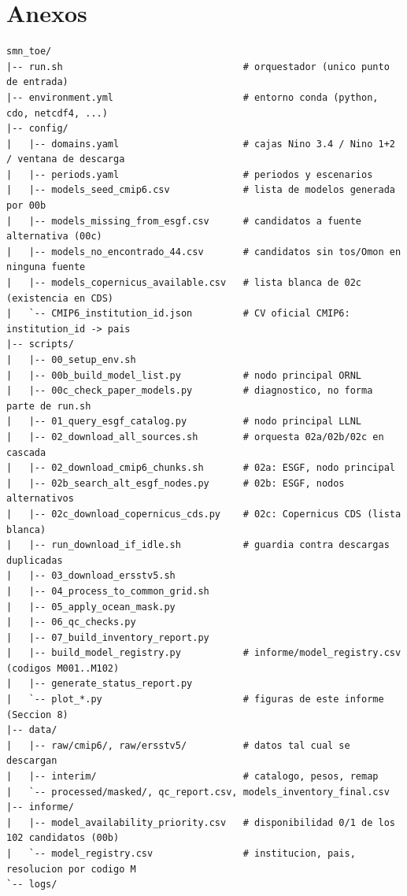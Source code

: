 \documentclass[11pt,a4paper]{article}
\begin{document}
\section{Anexos}
\begin{lstlisting}[style=bashstyle,caption={Estructura interna del repositorio \texttt{smn\_toe}.},label={lst:tree}]
smn_toe/
|-- run.sh                                # orquestador (unico punto de entrada)
|-- environment.yml                       # entorno conda (python, cdo, netcdf4, ...)
|-- config/
|   |-- domains.yaml                      # cajas Nino 3.4 / Nino 1+2 / ventana de descarga
|   |-- periods.yaml                      # periodos y escenarios
|   |-- models_seed_cmip6.csv             # lista de modelos generada por 00b
|   |-- models_missing_from_esgf.csv      # candidatos a fuente alternativa (00c)
|   |-- models_no_encontrado_44.csv       # candidatos sin tos/Omon en ninguna fuente
|   |-- models_copernicus_available.csv   # lista blanca de 02c (existencia en CDS)
|   `-- CMIP6_institution_id.json         # CV oficial CMIP6: institution_id -> pais
|-- scripts/
|   |-- 00_setup_env.sh
|   |-- 00b_build_model_list.py           # nodo principal ORNL
|   |-- 00c_check_paper_models.py         # diagnostico, no forma parte de run.sh
|   |-- 01_query_esgf_catalog.py          # nodo principal LLNL
|   |-- 02_download_all_sources.sh        # orquesta 02a/02b/02c en cascada
|   |-- 02_download_cmip6_chunks.sh       # 02a: ESGF, nodo principal
|   |-- 02b_search_alt_esgf_nodes.py      # 02b: ESGF, nodos alternativos
|   |-- 02c_download_copernicus_cds.py    # 02c: Copernicus CDS (lista blanca)
|   |-- run_download_if_idle.sh           # guardia contra descargas duplicadas
|   |-- 03_download_ersstv5.sh
|   |-- 04_process_to_common_grid.sh
|   |-- 05_apply_ocean_mask.py
|   |-- 06_qc_checks.py
|   |-- 07_build_inventory_report.py
|   |-- build_model_registry.py           # informe/model_registry.csv (codigos M001..M102)
|   |-- generate_status_report.py
|   `-- plot_*.py                         # figuras de este informe (Seccion 8)
|-- data/
|   |-- raw/cmip6/, raw/ersstv5/          # datos tal cual se descargan
|   |-- interim/                          # catalogo, pesos, remap
|   `-- processed/masked/, qc_report.csv, models_inventory_final.csv
|-- informe/
|   |-- model_availability_priority.csv   # disponibilidad 0/1 de los 102 candidatos (00b)
|   `-- model_registry.csv                # institucion, pais, resolucion por codigo M
`-- logs/
\end{lstlisting}
\end{document}
